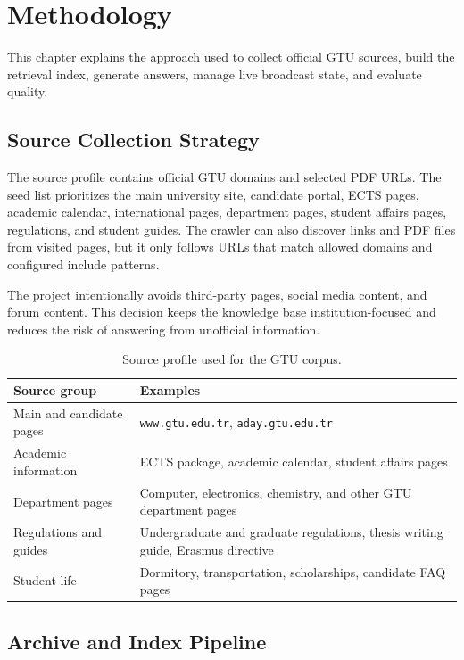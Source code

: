 \chapter{Methodology}

This chapter explains the approach used to collect official GTU sources, build the retrieval index, generate answers, manage live broadcast state, and evaluate quality.

\section{Source Collection Strategy}

The source profile contains official GTU domains and selected PDF URLs. The seed list prioritizes the main university site, candidate portal, ECTS pages, academic calendar, international pages, department pages, student affairs pages, regulations, and student guides. The crawler can also discover links and PDF files from visited pages, but it only follows URLs that match allowed domains and configured include patterns.

The project intentionally avoids third-party pages, social media content, and forum content. This decision keeps the knowledge base institution-focused and reduces the risk of answering from unofficial information.

\begin{table}[!htbp]
    \centering
    \caption{\label{tab:source-profile}Source profile used for the GTU corpus.}
    \begin{tabularx}{\textwidth}{lX}
        \toprule
        Source group & Examples \\
        \midrule
        Main and candidate pages & \texttt{www.gtu.edu.tr}, \texttt{aday.gtu.edu.tr} \\
        Academic information & ECTS package, academic calendar, student affairs pages \\
        Department pages & Computer, electronics, chemistry, and other GTU department pages \\
        Regulations and guides & Undergraduate and graduate regulations, thesis writing guide, Erasmus directive \\
        Student life & Dormitory, transportation, scholarships, candidate FAQ pages \\
        \bottomrule
    \end{tabularx}
\end{table}

\section{Archive and Index Pipeline}


